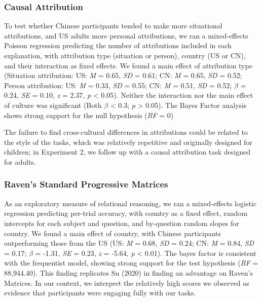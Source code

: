 \documentclass[
  man]{apa6}
\begin{document}
\hypertarget{causal-attribution-1}{%
\subsubsection{Causal Attribution}\label{causal-attribution-1}}

To test whether Chinese participants tended to make more situational attributions, and US adults more personal attributions, we ran a mixed-effects Poisson regression predicting the number of attributions included in each explanation, with attribution type (situation or person), country (US or CN), and their interaction as fixed effects. We found a main effect of attribution type (Situation attribution: US: \emph{M} = 0.65, \emph{SD} = 0.61; CN: \emph{M} = 0.65, \emph{SD} = 0.52; Person attribution: US: \emph{M} = 0.33, \emph{SD} = 0.55; CN: \emph{M} = 0.51, \emph{SD} = 0.52; \(\beta\) = 0.24, \emph{SE} = 0.10, \emph{z} = 2.37, \emph{p} \textless{} 0.05). Neither the interaction nor the main effect of culture was significant (Both \(\beta\) \textless{} 0.3; \emph{p} \textgreater{} 0.05). The Bayes Factor analysis shows strong support for the null hypothesis (\emph{BF} = 0)

The failure to find cross-cultural differences in attributions could be related to the style of the tasks, which was relatively repetitive and originally designed for children; in Experiment 2, we follow up with a causal attribution task designed for adults.

\hypertarget{ravens-standard-progressive-matrices-1}{%
\subsubsection{Raven's Standard Progressive Matrices}\label{ravens-standard-progressive-matrices-1}}

As an exploratory measure of relational reasoning, we ran a mixed-effects logistic regression predicting per-trial accuracy, with country as a fixed effect, random intercepts for each subject and question, and by-question random slopes for country. We found a main effect of country, with Chinese participants outperforming those from the US (US: \emph{M} = 0.68, \emph{SD} = 0.24; CN: \emph{M} = 0.84, \emph{SD} = 0.17; \(\beta\) = -1.31, \emph{SE} = 0.23, \emph{z} = -5.64, \emph{p} \textless{} 0.01). The bayes factor is consistent with the frequentist model, showing strong support for the test hypothesis (\emph{BF} = 88,944.40). This finding replicates Su (2020) in finding an advantage on Raven's Matrices. In our context, we interpret the relatively high scores we observed as evidence that participants were engaging fully with our tasks.
\end{document}
